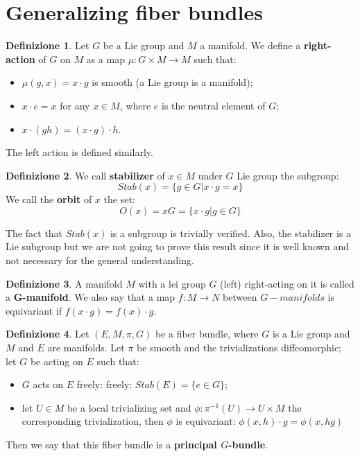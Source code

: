 \documentclass[12pt,a4paper]{report}
\theoremstyle{definition}
\newtheorem{Def}{Definizione}[chapter]
\theoremstyle{Theorem}
\theoremstyle{definition}
\theoremstyle{definition}
\theoremstyle{definition}
\begin{document}
	\section{Generalizing fiber bundles}
	\begin{Def}\label{Def_6.1}
		Let $G$ be a Lie group and $M$ a manifold. We define a \textbf{right-action} of $G$ on $M$ as a map $\mu:G\times M\rightarrow M$ such that:
		\begin{itemize}
			\item $\mu(g,x)=x\cdot g$ is smooth (a Lie group is a manifold);
			\item $x\cdot e=x$ for any $x\in M$, where $e$ is the neutral element of $G$;
			\item $x\cdot (gh)=(x\cdot g)\cdot h$.
		\end{itemize}
		The left action is defined similarly.
	\end{Def}
	\begin{Def}\label{Def_6.2}
		We call \textbf{stabilizer} of $x\in M$ under $G$ Lie group the subgroup:
		$$Stab(x)=\{g\in G|x\cdot g=x\}$$
		We call the \textbf{orbit} of $x$ the set:
		$$O(x)=xG=\{x\cdot g|g\in G\}$$
	\end{Def}
	The fact that $Stab(x)$ is a subgroup is trivially verified. Also, the stabilizer is a Lie subgroup but we are not going to prove this result since it is well known and not necessary for the general understanding.
	\begin{Def}\label{Def_6.3}
		A manifold $M$ with a lei group $G$ (left) right-acting on it is called a \textbf{G-manifold}. We also say that a map $f:M\rightarrow N$ between $G-manifolds$ is equivariant if $f(x\cdot g)=f(x)\cdot g$.
	\end{Def}
	\begin{Def}\label{Def_6.4}
		Let $(E,M,\pi,G)$ be a fiber bundle, where $G$ is a Lie group and $M$ and $E$ are manifolds. Let $\pi$ be smooth and the trivializations diffeomorphic; let $G$ be acting on $E$ such that:
		\begin{itemize}
			\item $G$ acts on $E$ freely: freely: $Stab(E)=\{e\in G\}$;
			\item let $U\in M$ be a local trivializing set and $\phi:\pi^{-1}(U)\rightarrow U\times M$  the corresponding trivialization, then $\phi$ is equivariant: $\phi(x,h)\cdot g=\phi(x,hg)$
		\end{itemize} 
		Then we say that this fiber bundle is a \textbf{principal $G$-bundle}.
	\end{Def}
\end{document}
